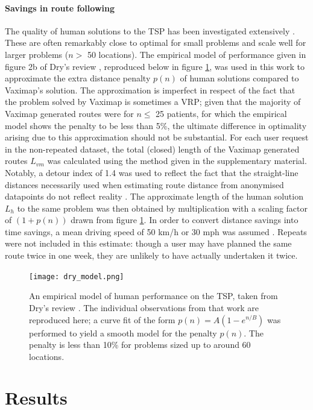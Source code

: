 \documentclass{article}
\def\vm{Vaximap}
\begin{document}
\paragraph{Savings in route following}
The quality of human solutions to the TSP has been investigated extensively \cite{Macgregor1996, MacGregor2011, Vickers2001, MacGregor1999a}. These are often remarkably close to optimal for small problems and scale well for larger problems ($n > $ 50 locations). The empirical model of performance given in figure 2b of Dry's review \cite{Dry2006}, reproduced below in figure \ref{dry_model}, was used in this work to approximate the extra distance penalty $p(n)$ of human solutions compared to \vm{}'s solution. The approximation is imperfect in respect of the fact that the problem solved by \vm{} is sometimes a VRP; given that the majority of \vm{} generated routes were for $n \leq$ 25 patients, for which the empirical model shows the penalty to be less than 5\%, the ultimate difference in optimality arising due to this approximation should not be substantial. For each user request in the non-repeated dataset, the total (closed) length of the \vm{} generated routes $L_{vm}$ was calculated using the method given in the supplementary material. Notably, a detour index of 1.4 was used to reflect the fact that the straight-line distances necessarily used when estimating route distance from anonymised datapoints do not reflect reality \cite{Cole1968}. The approximate length of the human solution $L_h$ to the same problem was then obtained by multiplication with a scaling factor of $(1 + p(n))$ drawn from figure \ref{dry_model}. In order to convert distance savings into time savings, a mean driving speed of 50 km/h or 30 mph was assumed \cite{Balendra2020}. Repeats were not included in this estimate: though a user may have planned the same route twice in one week, they are unlikely to have actually undertaken it twice.  

\begin{figure}[H]
\centering
\texttt{[image: dry\_model.png]}
\caption{An empirical model of human performance on the TSP, taken from Dry's review \cite{Dry2006}. The individual observations from that work are reproduced here; a curve fit of the form $p(n) = A(1 - e^{n/B})$ was performed to yield a smooth model for the penalty $p(n)$. The penalty is less than 10\% for problems sized up to around 60 locations.}
\label{dry_model}
\end{figure}

\section{Results}
\end{document}
